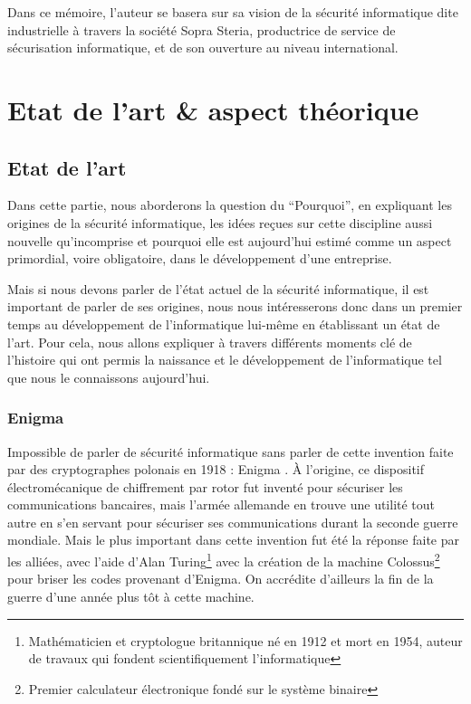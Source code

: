\documentclass[a4paper]{memoir}
\begin{document}
Dans ce mémoire, l'auteur se basera sur sa vision de la sécurité informatique dite industrielle à travers la société Sopra Steria, productrice de service de sécurisation informatique, et de son ouverture au niveau international.




\part{Etat de l'art \& aspect théorique}


\chapter{Etat de l'art}%

Dans cette partie, nous aborderons la question du ``Pourquoi'', en expliquant les origines de la sécurité informatique, les idées reçues sur cette discipline aussi nouvelle qu'incomprise et pourquoi elle est aujourd'hui estimé comme un aspect primordial, voire obligatoire, dans le développement d'une entreprise.

\noindent Mais si nous devons parler de l'état actuel de la sécurité informatique, il est important de parler de ses origines, nous nous intéresserons donc dans un premier temps au développement de l'informatique lui-même en établissant un état de l'art. Pour cela, nous allons expliquer à travers différents moments clé de l'histoire qui ont permis la naissance et le développement de l'informatique tel que nous le connaissons aujourd'hui.\\


\section{Enigma}

Impossible de parler de sécurité informatique sans parler de cette invention faite par des cryptographes polonais en 1918 : Enigma .
À l'origine, ce dispositif électromécanique de chiffrement par rotor fut inventé pour sécuriser les communications bancaires, mais l'armée allemande en trouve une utilité tout autre en s'en servant pour sécuriser ses communications durant la seconde guerre mondiale. Mais le plus important dans cette invention fut été la réponse faite par les alliées, avec l'aide d'Alan Turing\footnote{Mathématicien et cryptologue britannique né en 1912 et mort en 1954, auteur de travaux qui fondent scientifiquement l'informatique} avec la création de la machine Colossus\footnote{Premier calculateur électronique fondé sur le système binaire} pour briser les codes provenant d'Enigma. On accrédite d'ailleurs la fin de la guerre d'une année plus tôt à cette machine.
\end{document}
